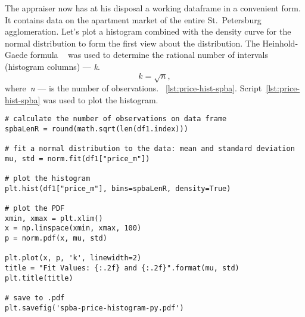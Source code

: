 \documentclass[]{scrreprt}
\begin{document}
The appraiser now has at his disposal a working dataframe in a convenient form. It contains data on the apartment market of the entire St.~Petersburg agglomeration. Let's plot a histogram combined with the density curve for the normal distribution to form the first view about the distribution. The Heinhold-Gaede formula ~\cite{Ingenieur-Statistik} was used to determine the rational number of intervals (histogram columns) --- \textit{k}.
\begin{equation}\label{eq:k-hist-Heinhold-Gaede}
k = \sqrt{n},
\end{equation}
where~\textit{n} --- is the number of observations. ~\ref{lst:price-hist-spba}. Script~\ref{lst:price-hist-spba} was used to plot the histogram.
%
\begin{lstlisting}[float=htp, caption = Plotting the histogram for the agglomeration of St.~Petersburg., firstnumber=1, label= lst:price-hist-spba]
# calculate the number of observations on data frame
spbaLenR = round(math.sqrt(len(df1.index)))

# fit a normal distribution to the data: mean and standard deviation
mu, std = norm.fit(df1["price_m"])

# plot the histogram
plt.hist(df1["price_m"], bins=spbaLenR, density=True)

# plot the PDF
xmin, xmax = plt.xlim()
x = np.linspace(xmin, xmax, 100)
p = norm.pdf(x, mu, std)

plt.plot(x, p, 'k', linewidth=2)
title = "Fit Values: {:.2f} and {:.2f}".format(mu, std)
plt.title(title)

# save to .pdf
plt.savefig('spba-price-histogram-py.pdf')
\end{lstlisting}
%
\end{document}
